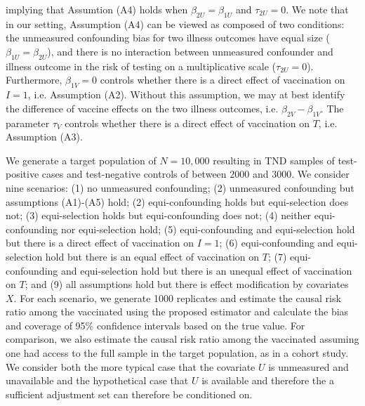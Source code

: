 \documentclass[11pt]{article}
\begin{document}
implying that Assumtion (A4) holds when $\beta_{2U}=\beta_{1U}$ and $\tau_{2U}=0$. We note that in our setting, Assumption (A4) can be viewed as composed of two conditions: the unmeasured confounding bias for two illness outcomes have equal size ($\beta_{1U}=\beta_{2U}$), and there is no interaction between unmeasured confounder and illness outcome in the risk of testing on a multiplicative scale ($\tau_{2U}=0$). Furthermore, $\beta_{1V}=0$ controls whether there is a direct effect of vaccination on $I = 1$, i.e. Assumption (A2). Without this assumption, we may at best identify the difference of vaccine effects on the two illness outcomes, i.e. $\beta_{2V}-\beta_{1V}$. The parameter $\tau_V$ controls whether there is a direct effect of vaccination on $T$, i.e. Assumption (A3).%

We generate a target population of $N = 10,000$ resulting in TND samples of test-positive cases and test-negative controls of between $2000$ and $3000$. We consider nine scenarios: (1) no unmeasured confounding; (2) unmeasured confounding but assumptions (A1)-(A5) hold; (2) equi-confounding holds but equi-selection does not; (3) equi-selection holds but equi-confounding does not; (4) neither equi-confounding nor equi-selection hold; (5) equi-confounding and equi-selection hold but there is a direct effect of vaccination on $I = 1$; (6) equi-confounding and equi-selection hold but there is an equal effect of vaccination on $T$; (7) equi-confounding and equi-selection hold but there is an unequal effect of vaccination on $T$; and (9) all assumptions hold but there is effect modification by covariates $X$. For each scenario, we generate 1000 replicates and estimate the causal risk ratio among the vaccinated using the proposed estimator and calculate the bias and coverage of 95\% confidence intervals based on the true value. For comparison, we also estimate the causal risk ratio among the vaccinated assuming one had access to the full sample in the target population, as in a cohort study. We consider both the more typical case that the covariate $U$ is unmeasured and unavailable and the hypothetical case that $U$ is available and therefore the a sufficient adjustment set can therefore be conditioned on. 
\end{document}
